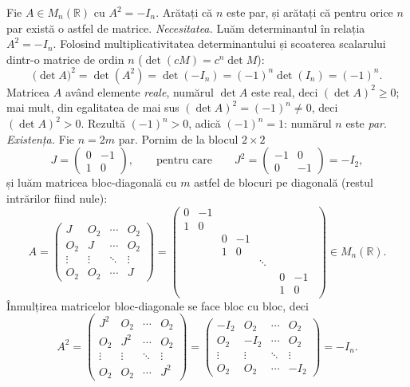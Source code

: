 Fie $A\in M_n(\mathbb{R})$ cu $A^2=-I_n$. Arătați că $n$ este par, și arătați că pentru orice $n$ par există o astfel de matrice.
\sol \emph{Necesitatea.} Luăm determinantul în relația $A^2=-I_n$. Folosind multiplicativitatea determinantului și scoaterea scalarului dintr-o matrice de ordin $n$ ($\det(cM)=c^n\det M$):
\[ \bigl(\det A\bigr)^2=\det(A^2)=\det(-I_n)=(-1)^n\det(I_n)=(-1)^n . \]
Matricea $A$ având elemente \emph{reale}, numărul $\det A$ este real, deci $(\det A)^2\ge0$; mai mult, din egalitatea de mai sus $(\det A)^2=(-1)^n\neq0$, deci $(\det A)^2>0$. Rezultă $(-1)^n>0$, adică $(-1)^n=1$: numărul $n$ este \emph{par}.\\[2pt]
\emph{Existența.} Fie $n=2m$ par. Pornim de la blocul $2\times2$
\[ J=\begin{pmatrix}0&-1\\1&0\end{pmatrix},\qquad\text{pentru care}\qquad J^2=\begin{pmatrix}-1&0\\0&-1\end{pmatrix}=-I_2 , \]
și luăm matricea bloc-diagonală cu $m$ astfel de blocuri pe diagonală (restul intrărilor fiind nule):
\[ A=\begin{pmatrix}
 J & O_2 & \cdots & O_2\\
 O_2 & J & \cdots & O_2\\
 \vdots & \vdots & \ddots & \vdots\\
 O_2 & O_2 & \cdots & J
\end{pmatrix}
=\begin{pmatrix}
 0&-1& & & & \\
 1& 0& & & & \\
  &  &0&-1& & \\
  &  &1& 0& & \\
  &  & &  &\ddots& \\
  &  & &  & &\begin{matrix}0&-1\\1&0\end{matrix}
\end{pmatrix}\in M_n(\mathbb{R}) . \]
Înmulțirea matricelor bloc-diagonale se face bloc cu bloc, deci
\[ A^2=\begin{pmatrix}
 J^2 & O_2 & \cdots & O_2\\
 O_2 & J^2 & \cdots & O_2\\
 \vdots & \vdots & \ddots & \vdots\\
 O_2 & O_2 & \cdots & J^2
\end{pmatrix}
=\begin{pmatrix}
 -I_2 & O_2 & \cdots & O_2\\
 O_2 & -I_2 & \cdots & O_2\\
 \vdots & \vdots & \ddots & \vdots\\
 O_2 & O_2 & \cdots & -I_2
\end{pmatrix}=-I_n . \]
